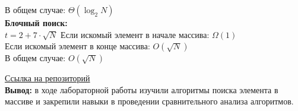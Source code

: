 \documentclass[a4paper,14pt]{extarticle}
\begin{document}
\begin{enumerate}
	      В общем случае: $\Theta(\log_2 N)$\\
	      \textbf{Блочный поиск:}\\
	      $t = 2 + 7 \cdot \sqrt{N} $
		  Если искомый элемент в начале массива: $\Omega(1)$\\
	      Если искомый элемент в конце массива: $O(\sqrt{N})$\\
	      В общем случае: $O(\sqrt{N})$
\end{enumerate}
\href{https://github.com/IAmProgrammist/algorithms_and_data_structures/tree/main}{Ссылка на репозиторий}\\
\textbf{Вывод: } в ходе лабораторной работы изучили алгоритмы поиска элемента в массиве и закрепили
навыки в проведении сравнительного анализа алгоритмов.
\end{document}
